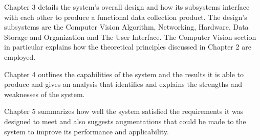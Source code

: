 Chapter 3 details the system's overall design and how its subsystems interface with each other to produce a functional data collection product. The design's subsystems are the Computer Vision Algorithm, Networking, Hardware, Data Storage and Organization and The User Interface. The Computer Vision section in particular explains how the theoretical principles discussed in Chapter 2 are employed.

Chapter 4 outlines the capabilities of the system and the results it is able to produce and gives an analysis that identifies and explains the strengths and weaknesses of the system.

Chapter 5 summarizes how well the system satisfied the requirements it was designed to meet and also suggests augmentations that could be made to the system to improve its performance and applicability.



